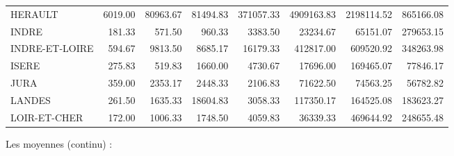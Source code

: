 \documentclass[11pt, a4paper]{article}
\begin{document}
\begin{tabular}{lrrrrrrr}
  HERAULT & 6019.00 & 80963.67 & 81494.83 & 371057.33 & 4909163.83 & 2198114.52 & 865166.08 \\ 
  INDRE & 181.33 & 571.50 & 960.33 & 3383.50 & 23234.67 & 65151.07 & 279653.15 \\ 
  INDRE-ET-LOIRE & 594.67 & 9813.50 & 8685.17 & 16179.33 & 412817.00 & 609520.92 & 348263.98 \\
  ISERE & 275.83 & 519.83 & 1660.00 & 4730.67 & 17696.00 & 169465.07 & 77846.17 \\
  JURA & 359.00 & 2353.17 & 2448.33 & 2106.83 & 71622.50 & 74563.25 & 56782.82 \\ 
  LANDES & 261.50 & 1635.33 & 18604.83 & 3058.33 & 117350.17 & 164525.08 & 183623.27 \\ 
  LOIR-ET-CHER & 172.00 & 1006.33 & 1748.50 & 4059.83 & 36339.33 & 469644.92 & 248655.48 \\ 
  \hline
\end{tabular}
\FloatBarrier
\newpage
Les moyennes (continu) :
\FloatBarrier
\end{document}
